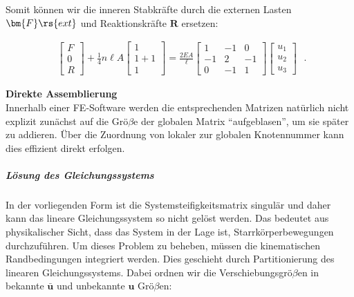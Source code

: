 Somit können wir die inneren Stabkräfte durch die externen Lasten $\bm{F}\rs{ext}$ und Reaktionskräfte $\bm{R}$ ersetzen:

\begin{equation}
\label{stabFEM9}
\begin{align}
\begin{bmatrix}
F \\
0 \\
R
\end{bmatrix} + \frac{1}{4}n\ell A \begin{bmatrix}
1 \\
1+1\\
1
\end{bmatrix} = \frac{2EA}{\ell}\begin{bmatrix}
1 & -1 & 0\\
-1 & 2 & -1\\
0 & -1 & 1
\end{bmatrix} \begin{bmatrix}
u_1 \\
u_2\\
u_3
\end{bmatrix}
\end{align} \; .
\end{equation}

\begin{framed}
\textbf{Direkte Assemblierung}\\
Innerhalb einer FE-Software werden die entsprechenden Matrizen natürlich nicht explizit zunächst auf die Grö$\beta$e der globalen Matrix ``aufgeblasen'', um sie später zu addieren. Über die Zuordnung von lokaler zur globalen Knotennummer kann dies effizient direkt erfolgen.
\end{framed}


\subparagraph{Lösung des Gleichungssystems}

In der vorliegenden Form ist die Systemsteifigkeitsmatrix singulär und daher kann das lineare Gleichungssystem so nicht gelöst werden. Das bedeutet aus physikalischer Sicht, dass das System in der Lage ist, Starrkörperbewegungen durchzuführen. Um dieses Problem zu beheben, müssen die kinematischen Randbedingungen integriert werden. Dies geschieht durch Partitionierung des linearen Gleichungssystems. Dabei ordnen wir die Verschiebungsgrö$\beta$en in bekannte $\bar{\bm{u}}$ und unbekannte $\bm{u}$ Grö$\beta$en:

